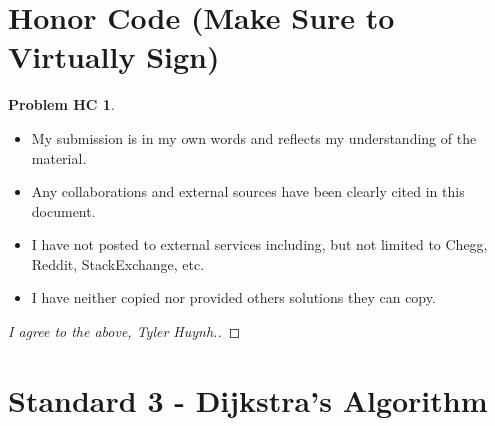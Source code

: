 \documentclass[11pt]{article}
\theoremstyle{definition}
\theoremstyle{definition}
\newtheorem*{requiredHC}{Problem HC}
\theoremstyle{definition}
\begin{document}
\newpage
\section*{Honor Code (Make Sure to Virtually Sign)} \label{HonorCode}
\hypertarget{HonorCode}{}

\begin{requiredHC}
\begin{itemize}
\item My submission is in my own words and reflects my understanding of the material.
\item Any collaborations and external sources have been clearly cited in this document.
\item I have not posted to external services including, but not limited to Chegg, Reddit, StackExchange, etc.
\item I have neither copied nor provided others solutions they can copy.
\end{itemize}

\end{requiredHC}

\begin{proof}[I agree to the above, Tyler Huynh.]
\end{proof}



\newpage
\setcounter{section}{2}
\section{Standard 3 - Dijkstra's Algorithm}
\end{document}
